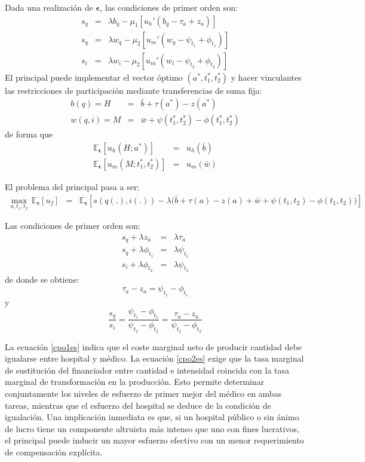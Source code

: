 ﻿\documentclass[12pt,letterpaper]{article}
\begin{document}
Dada una realizaci\'on de $\bm{\epsilon}$, las condiciones de primer orden son:
\begin{eqnarray*}
  s_q &=& \lambda b_q-\mu_1[u_h'(b_q-\tau_a+z_a)]\\
  s_q &=& \lambda w_q-\mu_2[u_m'(w_q-\psi_{t_1}+\phi_{t_1})]\\
  s_i &=& \lambda w_i-\mu_2[u_m'(w_i-\psi_{t_2}+\phi_{t_2})]
\end{eqnarray*}
El principal puede implementar el vector \'optimo $(a^*,t_1^*,t_2^*)$ y hacer vinculantes las restricciones de participaci\'on mediante transferencias de suma fija:
\begin{eqnarray*}
b(q)=H &=& \bar{b}+\tau(a^*)-z(a^*)\\
w(q,i)=M &=& \bar{w}+\psi(t_1^*,t_2^*)-\phi(t_1^*,t_2^*)
\end{eqnarray*}
de forma que
\begin{eqnarray*}
\mathbb{E}_{\bm{\epsilon}}[u_h(H;a^*)] &=& u_h(\bar{b})\\
\mathbb{E}_{\bm{\epsilon}}[u_m(M;t_1^*,t_2^*)] &=& u_m(\bar{w})
\end{eqnarray*}

El problema del principal pasa a ser:
\begin{eqnarray*}\label{maxf05es}
\nonumber \max\limits_{a,t_1,t_2}\,
\mathbb{E}_{\bm{\epsilon}}[u_f]
&=&
\mathbb{E}_{\bm{\epsilon}}
\left[
s(q(.),i(.))-\lambda\big(\bar{b}+\tau(a)-z(a)+\bar{w}+\psi(t_1,t_2)-\phi(t_1,t_2)\big)
\right]
\end{eqnarray*}

Las condiciones de primer orden son:
\begin{eqnarray}
  s_q+\lambda z_a &=& \lambda\tau_a \\
  s_q+\lambda\phi_{t_1} &=& \lambda\psi_{t_1} \\
  s_i+\lambda\phi_{t_2} &=& \lambda\psi_{t_2}
\end{eqnarray}
de donde se obtiene:
\begin{equation}\label{cpo1es}
    \tau_a-z_a=\psi_{t_1}-\phi_{t_1}
\end{equation}
y
\begin{equation}\label{cpo2es}
\frac{s_q}{s_i}=
\frac{\psi_{t_1}-\phi_{t_1}}{\psi_{t_2}-\phi_{t_2}}=
\frac{\tau_a-z_a}{\psi_{t_2}-\phi_{t_2}}
\end{equation}

La ecuaci\'on \ref{cpo1es} indica que el coste marginal neto de producir cantidad debe igualarse entre hospital y m\'edico. La ecuaci\'on \ref{cpo2es} exige que la tasa marginal de sustituci\'on del financiador entre cantidad e intensidad coincida con la tasa marginal de transformaci\'on en la producci\'on. Esto permite determinar conjuntamente los niveles de esfuerzo de primer mejor del m\'edico en ambas tareas, mientras que el esfuerzo del hospital se deduce de la condici\'on de igualaci\'on. Una implicaci\'on inmediata es que, si un hospital p\'ublico o sin \'animo de lucro tiene un componente altruista m\'as intenso que uno con fines lucrativos, el principal puede inducir un mayor esfuerzo efectivo con un menor requerimiento de compensaci\'on expl\'icita.
\end{document}
